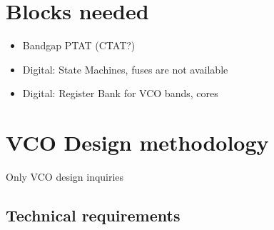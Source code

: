 \documentclass{article}
\begin{document}


\section{Blocks needed} 

\begin{itemize}
	\item Bandgap PTAT (CTAT?)
	\item Digital: State Machines, fuses are not available
	\item Digital: Register Bank for VCO bands, cores
\end{itemize}


\newpage

\section{VCO Design methodology}

Only VCO design inquiries



\subsection*{Technical requirements}
\end{document}
